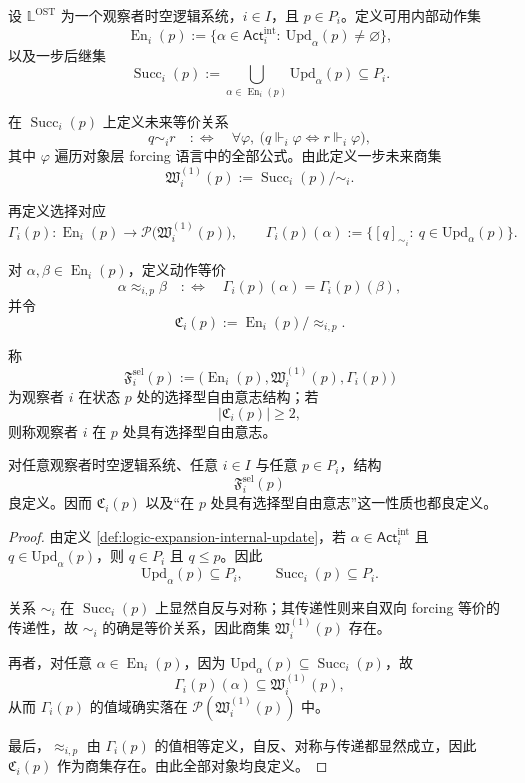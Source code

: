 \begin{definition}[选择型自由意志结构]\label{def:logic-expansion-choice-spectrum-structure}
设 \(\mathbb{L}^{\mathrm{OST}}\) 为一个观察者时空逻辑系统，\(i\in I\)，且 \(p\in P_i\)。定义可用内部动作集
\[
\operatorname{En}_i(p)
:=
\{\alpha\in \mathsf{Act}_i^{\mathrm{int}}:\ \mathrm{Upd}_\alpha(p)\neq\varnothing\},
\]
以及一步后继集
\[
\operatorname{Succ}_i(p)
:=
\bigcup_{\alpha\in \operatorname{En}_i(p)}\mathrm{Upd}_\alpha(p)
\subseteq P_i.
\]

在 \(\operatorname{Succ}_i(p)\) 上定义未来等价关系
\[
q\sim_i r
\quad:\Longleftrightarrow\quad
\forall \varphi,\ \bigl(q\Vdash_i\varphi \iff r\Vdash_i\varphi\bigr),
\]
其中 \(\varphi\) 遍历对象层 forcing 语言中的全部公式。由此定义一步未来商集
\[
\mathfrak W_i^{(1)}(p):=\operatorname{Succ}_i(p)/{\sim_i}.
\]

再定义选择对应
\[
\Gamma_i(p):\operatorname{En}_i(p)\to \mathcal P\bigl(\mathfrak W_i^{(1)}(p)\bigr),
\qquad
\Gamma_i(p)(\alpha):=
\{[q]_{\sim_i}:\ q\in \mathrm{Upd}_\alpha(p)\}.
\]

对 \(\alpha,\beta\in \operatorname{En}_i(p)\)，定义动作等价
\[
\alpha\approx_{i,p}\beta
\quad:\Longleftrightarrow\quad
\Gamma_i(p)(\alpha)=\Gamma_i(p)(\beta),
\]
并令
\[
\mathfrak C_i(p):=\operatorname{En}_i(p)/{\approx_{i,p}}.
\]

称
\[
\mathfrak F_i^{\mathrm{sel}}(p)
:=
\bigl(\operatorname{En}_i(p),\mathfrak W_i^{(1)}(p),\Gamma_i(p)\bigr)
\]
为观察者 \(i\) 在状态 \(p\) 处的选择型自由意志结构；若
\[
|\mathfrak C_i(p)|\ge 2,
\]
则称观察者 \(i\) 在 \(p\) 处具有选择型自由意志。
\end{definition}

\begin{theorem}[良定义]\label{thm:logic-expansion-choice-spectrum-well-defined}
对任意观察者时空逻辑系统、任意 \(i\in I\) 与任意 \(p\in P_i\)，结构
\[
\mathfrak F_i^{\mathrm{sel}}(p)
\]
良定义。因而 \(\mathfrak C_i(p)\) 以及“在 \(p\) 处具有选择型自由意志”这一性质也都良定义。
\end{theorem}

\begin{proof}
由定义 \ref{def:logic-expansion-internal-update}，若 \(\alpha\in \mathsf{Act}_i^{\mathrm{int}}\) 且 \(q\in \mathrm{Upd}_\alpha(p)\)，则 \(q\in P_i\) 且 \(q\le p\)。因此
\[
\mathrm{Upd}_\alpha(p)\subseteq P_i,
\qquad
\operatorname{Succ}_i(p)\subseteq P_i.
\]

关系 \(\sim_i\) 在 \(\operatorname{Succ}_i(p)\) 上显然自反与对称；其传递性则来自双向 forcing 等价的传递性，故 \(\sim_i\) 的确是等价关系，因此商集 \(\mathfrak W_i^{(1)}(p)\) 存在。

再者，对任意 \(\alpha\in \operatorname{En}_i(p)\)，因为 \(\mathrm{Upd}_\alpha(p)\subseteq \operatorname{Succ}_i(p)\)，故
\[
\Gamma_i(p)(\alpha)\subseteq \mathfrak W_i^{(1)}(p),
\]
从而 \(\Gamma_i(p)\) 的值域确实落在 \(\mathcal P(\mathfrak W_i^{(1)}(p))\) 中。

最后，\(\approx_{i,p}\) 由 \(\Gamma_i(p)\) 的值相等定义，自反、对称与传递都显然成立，因此 \(\mathfrak C_i(p)\) 作为商集存在。由此全部对象均良定义。
\end{proof}

